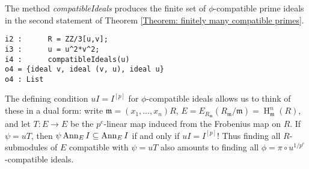 \documentclass[11pt]{amsart}
\DeclareMathOperator{\HH}{H}
\begin{document}
The method \emph{compatibleIdeals} produces the finite set of $\phi$-compatible prime ideals in the second statement of Theorem \ref{Theorem: finitely many compatible primes}.

\begin{verbatim}
i2 :      R = ZZ/3[u,v];
i3 :      u = u^2*v^2;
i4 :      compatibleIdeals(u)
o4 = {ideal v, ideal (v, u), ideal u}
o4 : List
\end{verbatim}

The defining condition $u I = I^{[p]}$ for $\phi$-compatible ideals allows us to
think of these in a dual form: write $\mathfrak{m}=(x_1, \dots, x_n)R$,
$E=E_{R_\mathfrak{m}}(R_{\mathfrak{m}}/\mathfrak{m})=\HH^n_{\mathfrak{m}} (R)$, and let $T: E \rightarrow E$ be the $p^e$-linear map
induced from the Frobenius map on $R$.
If $\psi=u T$, then $\psi \operatorname{{Ann}}_E I \subseteq \operatorname{{Ann}}_E I$ if and only if $u I = I^{[p]}$!
Thus finding all $R$-submodules of $E$ compatible with $\psi=u T$ also amounts to finding all
$\phi=\pi \circ u^{1/p^e}$-compatible ideals.
\end{document}
